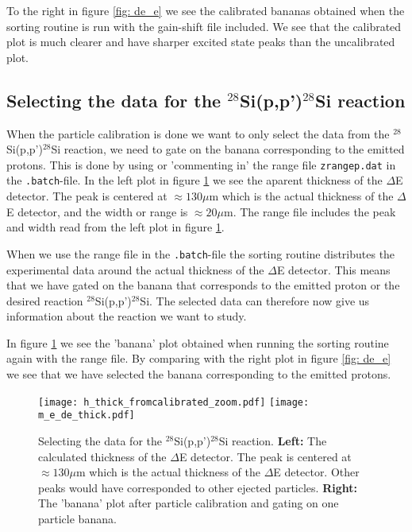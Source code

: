 \documentclass[11pt,a4wide]{article}
\begin{document}
To the right in figure \ref{fig: de_e} we see the calibrated bananas obtained when the sorting routine is run with the gain-shift file included. We see that the calibrated plot is much clearer and have sharper excited state peaks than the uncalibrated plot. 

\subsection{Selecting the data for the ${}^{28}$Si(p,p')$^{28}$Si reaction}
When the particle calibration is done we want to only select the data from the ${}^{28}$Si(p,p')$^{28}$Si reaction, we need to gate on the banana corresponding to the emitted protons. This is done by using or 'commenting in' the range file \texttt{zrangep.dat} in the \texttt{.batch}-file. In the left plot in figure \ref{fig: banana_gate} we see the aparent thickness of the $\Delta$E detector. The peak is centered at $\approx 130 \mu$m which is the actual thickness of the $\Delta$E detector, and the width or range is $\approx 20\mu$m. The range file includes the peak and width read from the left plot in figure \ref{fig: banana_gate}. 

When we use the range file in the \texttt{.batch}-file the sorting routine distributes the experimental data around the actual thickness of the $\Delta$E detector. This means that we have gated on the banana that corresponds to the emitted proton or the desired reaction ${}^{28}$Si(p,p')$^{28}$Si. The selected data can therefore now give us information about the reaction we want to study. 

In figure \ref{fig: banana_gate} we see the 'banana' plot obtained when running the sorting routine again with the range file. By comparing with the right plot in figure \ref{fig: de_e} we see that we have selected the banana corresponding to the emitted protons. 

\begin{figure}[htp]
\centering 
\texttt{[image: h\_thick\_fromcalibrated\_zoom.pdf]}
\texttt{[image: m\_e\_de\_thick.pdf]}
\caption{Selecting the data for the ${}^{28}$Si(p,p')$^{28}$Si reaction. \textbf{Left:} The calculated thickness of the $\Delta$E detector. The peak is centered at $\approx 130 \mu$m which is the actual thickness of the $\Delta$E detector. Other peaks would have corresponded to other ejected particles. \textbf{Right:} The 'banana' plot after particle calibration and gating on one particle banana.}
\label{fig: banana_gate}
\end{figure}
\end{document}
